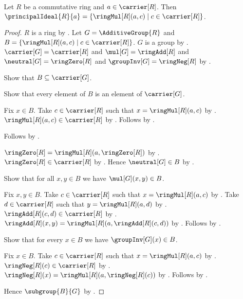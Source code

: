 \begin{theorem}\label{principal_ideal_eq_multiple_carrier}
    Let $R$ be a commutative ring and $a\in\carrier[R]$.
    Then
        $\principalIdeal{R}{a}
            =\{\ringMul[R](a,c)\mid c\in\carrier[R]\}$.
\end{theorem}
\begin{proof}
    $R$ is a ring by .
    Let $G=\AdditiveGroup{R}$ and
        $B=\{\ringMul[R](a,c)\mid c\in\carrier[R]\}$.
    $G$ is a group by .
    $\carrier[G]=\carrier[R]$ and
        $\mul[G]=\ringAdd[R]$ and
        $\neutral[G]=\ringZero[R]$ and
        $\groupInv[G]=\ringNeg[R]$ by
        .

    Show that $B\subseteq\carrier[G]$.
    \begin{subproof}
        Show that every element of $B$ is an element of $\carrier[G]$.
        \begin{subproof}
            Fix $x\in B$.
            Take $c\in\carrier[R]$ such that
                $x=\ringMul[R](a,c)$ by \auto.
            $\ringMul[R](a,c)\in\carrier[R]$ by .
            Follows by \auto.
        \end{subproof}
        Follows by .
    \end{subproof}

    $\ringZero[R]=\ringMul[R](a,\ringZero[R])$ by
        .
    $\ringZero[R]\in\carrier[R]$ by .
    Hence $\neutral[G]\in B$ by \auto.

    Show that for all $x,y\in B$ we have $\mul[G](x,y)\in B$.
    \begin{subproof}
        Fix $x,y\in B$.
        Take $c\in\carrier[R]$ such that
            $x=\ringMul[R](a,c)$ by \auto.
        Take $d\in\carrier[R]$ such that
            $y=\ringMul[R](a,d)$ by \auto.
        $\ringAdd[R](c,d)\in\carrier[R]$ by .
        $\ringAdd[R](x,y)
            =\ringMul[R](a,\ringAdd[R](c,d))$ by
            .
        Follows by \auto.
    \end{subproof}

    Show that for every $x\in B$ we have $\groupInv[G](x)\in B$.
    \begin{subproof}
        Fix $x\in B$.
        Take $c\in\carrier[R]$ such that
            $x=\ringMul[R](a,c)$ by \auto.
        $\ringNeg[R](c)\in\carrier[R]$ by .
        $\ringNeg[R](x)=\ringMul[R](a,\ringNeg[R](c))$ by
            .
        Follows by \auto.
    \end{subproof}
    Hence $\subgroup{B}{G}$ by .


\end{proof}
